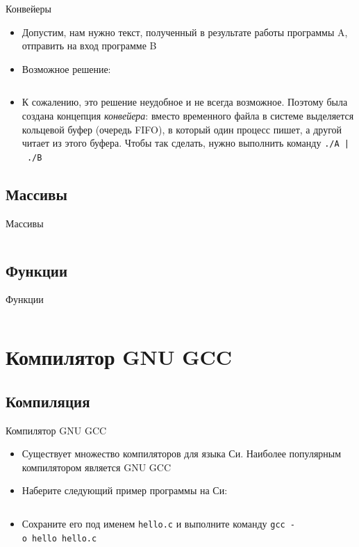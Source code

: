 \documentclass{beamer}
\begin{document}
\begin{frame}{Конвейеры}
	\begin{itemize}
		\item{Допустим, нам нужно текст, полученный в результате работы программы A, отправить на вход программе B}\pause
		\item{Возможное решение:}
	\end{itemize}
	\vspace*{-\baselineskip}
	\inputminted[linenos,bgcolor=listing]{bash}{files/01/nopipe.sh}\pause
	\vspace*{-\baselineskip}
	\begin{itemize}
		\item{К сожалению, это решение неудобное и не всегда возможное. Поэтому была создана концепция \emph{конвейера}: вместо временного файла в системе выделяется кольцевой буфер (очередь FIFO), в который один процесс пишет, а другой читает из этого буфера. Чтобы так сделать, нужно выполнить команду \texttt{./A~|~./B}}
	\end{itemize}
\end{frame}

\subsection{Массивы}
\begin{frame}{Массивы}
	\inputminted[linenos,bgcolor=listing]{bash}{files/01/arrays.sh}
\end{frame}

\subsection{Функции}
\begin{frame}{Функции}
	\inputminted[linenos,bgcolor=listing]{bash}{files/01/functions.sh}
\end{frame}

\section{Компилятор GNU GCC}

\subsection{Компиляция}
\begin{frame}{Компилятор GNU GCC}
	\begin{itemize}
		\item{Существует множество компиляторов для языка Си. Наиболее популярным компилятором является GNU GCC}\pause
		\item{Наберите следующий пример программы на Си:}
	\end{itemize}
	\vspace*{-\baselineskip}
	\inputminted[linenos,bgcolor=listing]{C}{files/01/hello.c}\pause
	\vspace*{-\baselineskip}
	\begin{itemize}
		\item{Сохраните его под именем \texttt{hello.c} и выполните команду \texttt{gcc~-o~hello~hello.c}}
	\end{itemize}
\end{frame}
\end{document}
